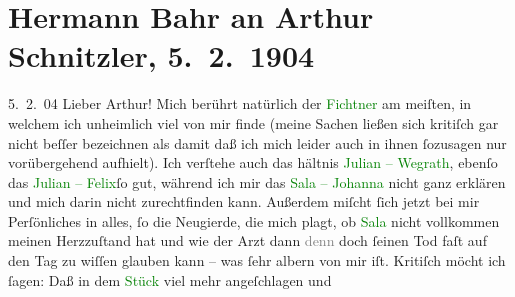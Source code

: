 

               \section[Hermann Bahr an Arthur Schnitzler, 5. 2. 1904]{ Hermann Bahr an Arthur Schnitzler, 5. 2. 1904}\nopagebreak{}\rehead{ }\normalsize\beginnumbering{} \toendnotes[C]{\smallbreak\pagebreak[2]} 
\toendnotes[C]{\smallbreak}\pstart
           \raggedleft{}{\pb}5. 2. 04\pend
           \pstart{}Lieber Arthur!\pend\pstart
           Mich berührt natürlich der \textcolor{green}{Fichtner}{} am meiſten, in welchem
               ich unheimlich viel von mir finde (meine Sachen ließen sich kritiſch gar nicht beſſer
               bezeichnen als damit daß ich mich leider auch in ihnen ſozusagen nur vorübergehend
                  aufhielt). Ich verſtehe auch das hältnis \textcolor{green}{Julian –
               Wegrath}{}, ebenſo das \textcolor{green}{Julian –
                  Felix}{}ſo gut, während ich mir das \textcolor{green}{Sala – Johanna}{} nicht ganz erklären und mich
               darin nicht zurechtfinden kann. Außerdem miſcht ſich jetzt bei mir Perſönliches in
               alles, ſo die Neugierde, die mich plagt, ob \textcolor{green}{Sala}{} nicht vollkommen meinen Herzzuſtand hat und wie der
               Arzt dann \textcolor{gray}{denn} doch ſeinen Tod faſt auf den Tag zu wiſſen glauben
               kann – was ſehr albern von mir iſt.\pend
           \pstart
           {\pb}Kritiſch möcht ich ſagen: Daß in dem \textcolor{green}{Stück}{} viel mehr angeſchlagen und
